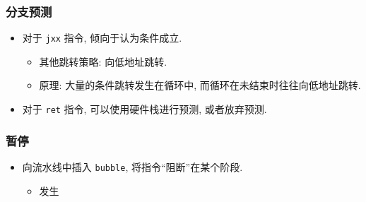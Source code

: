 \documentclass{ctexbeamer}
\newcommand{\ftitle}[1]{\frametitle{\hspace{4ex} {#1}}}
\begin{document}
\begin{frame}
    \ftitle{分支预测}
    \begin{itemize}
        \item 对于 \texttt{jxx} 指令, 倾向于认为条件成立.
        \begin{itemize}
            \item 其他跳转策略: 向低地址跳转.
            \item 原理: 大量的条件跳转发生在循环中, 而循环在未结束时往往向低地址跳转.
        \end{itemize}
        \item 对于 \texttt{ret} 指令, 可以使用硬件栈进行预测, 或者放弃预测.
    \end{itemize}
\end{frame}

\begin{frame}
    \ftitle{暂停}
    \begin{itemize}
        \item 向流水线中插入 \texttt{bubble}, 将指令``阻断''在某个阶段.
        \begin{itemize}
            \item 发生
        \end{itemize}
    \end{itemize}
\end{frame}
\end{document}
